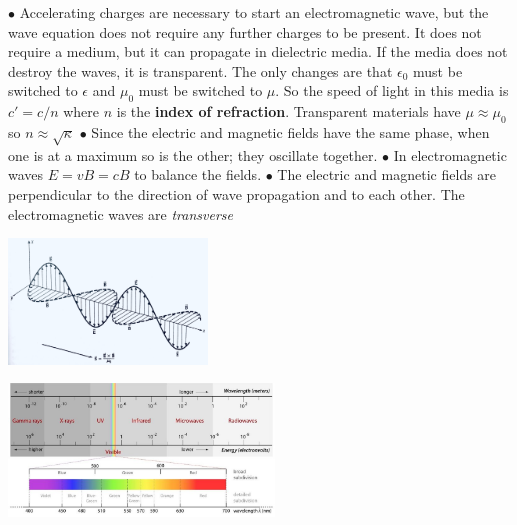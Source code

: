     \newline \indent $\bullet$
    Accelerating charges are necessary to start an electromagnetic wave, but the wave equation does not require any further charges to be present. It does not require a medium, but it can propagate in dielectric media. If the media does not destroy the waves, it is transparent. The only changes are that $\epsilon_0$ must be switched to $\epsilon$ and $\mu_0$ must be switched to $\mu$. So the speed of light in this media is $c' = c/n$ where $n$ is the \textbf{index of refraction}. Transparent materials have $\mu \approx \mu_0$ so $n \approx \sqrt{\kappa}$
    \newline \indent $\bullet$
    Since the electric and magnetic fields have the same phase, when one is at a maximum so is the other; they oscillate together.
    \newline \indent $\bullet$
    In electromagnetic waves $E = vB = cB$ to balance the fields.
    \newline \indent $\bullet$
    The electric and magnetic fields are perpendicular to the direction of wave propagation and to each other. The electromagnetic waves are \textit{transverse}
    \begin{center}
        \includegraphics[width=150pt]{electromagnetic.jpg}
    \end{center}
    \begin{center}
        \includegraphics[width=200pt]{spectrum}
    \end{center}
